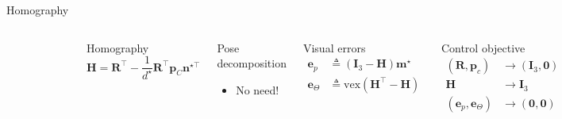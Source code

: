 \documentclass{beamer}
\begin{document}
\begin{frame}{Homography}
\begin{columns}
	\begin{figure}
		\includegraphics[width = 50mm]{Images/Notation.png}
	\end{figure}\vspace{-0.5cm}
	
	\begin{block}{Homography}
		\begin{equation*}\label{def:homo}
		\mathbf{H} = \mathbf{R}^{\!\top} - \frac{1}{d^\star} \mathbf{R}^{\!\top} \mathbf{p}_C \mathbf{n}^{\star\!\top} 
		\end{equation*}
	\end{block}
	\begin{block}{Pose decomposition}
		\begin{itemize}
			\item No need!
		\end{itemize}
	\end{block}

	\begin{block}{Visual errors}
		\[
		\begin{array}{rl}
			\mathbf{e}_p &\triangleq (\mathbf{I}_3 - \mathbf{H})\mathbf{m}^\star\\
			\mathbf{e}_\Theta &\triangleq \mathrm{vex}(\mathbf{H}^\top - \mathbf{H}) 
		\end{array}
		\]		
	\end{block}
	\begin{block}{Control objective}
		\[
		\begin{array}{rl}
		(\mathbf{R}, \mathbf{p}_c) & \longrightarrow (\mathbf{I}_3, \mathbf{0})\\
		\mathbf{H} & \longrightarrow \mathbf{I}_3\\
		(\mathbf{e}_p, \mathbf{e}_\Theta) & \longrightarrow (\mathbf{0}, \mathbf{0})
		\end{array}
		\]	
	\end{block}
	
\end{columns}

\end{frame}
\end{document}
